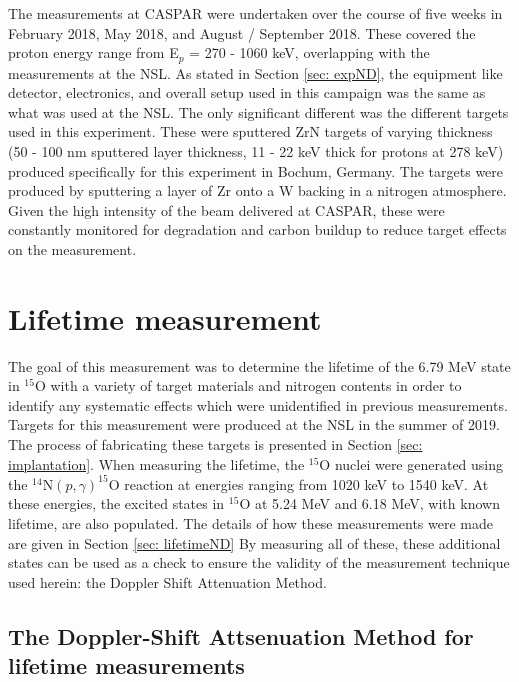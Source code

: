 The measurements at CASPAR were undertaken over the course of five weeks in February 2018, May 2018, and August / September 2018. These covered the proton energy range from E$_{p}$ = 270 - 1060 keV, overlapping with the measurements at the NSL. As stated in Section \ref{sec: expND}, the equipment like detector, electronics, and overall setup used in this campaign was the same as what was used at the NSL. The only significant different was the different targets used in this experiment. These were sputtered ZrN targets of varying thickness (50 - 100 nm sputtered layer thickness, 11 - 22 keV thick for protons at 278 keV) produced specifically for this experiment in Bochum, Germany. The targets were produced by sputtering a layer of Zr onto a W backing in a nitrogen atmosphere. Given the high intensity of the beam delivered at CASPAR, these were constantly monitored for degradation and carbon buildup to reduce target effects on the measurement. 





\section{Lifetime measurement}
\label{sec: lifetime experiment}

The goal of this measurement was to determine the lifetime of the 6.79 MeV state in $^{15}$O with a variety of target materials and nitrogen contents in order to identify any systematic effects which were unidentified in previous measurements. Targets for this measurement were produced at the NSL in the summer of 2019. The process of fabricating these targets is presented in Section \ref{sec: implantation}. When measuring the lifetime, the $^{15}$O nuclei were generated using the  $^{14}$N$\left( p,\gamma \right) ^{15}$O reaction at energies ranging from 1020 keV to 1540 keV. At these energies, the excited states in $^{15}$O at 5.24 MeV and 6.18 MeV, with known lifetime, are also populated. The details of how these measurements were made are given in Section \ref{sec: lifetimeND} By measuring all of these, these additional states can be used as a check to ensure the validity of the measurement technique used herein: the Doppler Shift Attenuation Method. 


\subsection{The Doppler-Shift Attsenuation Method for lifetime measurements}
\label{sec: DSAM}


